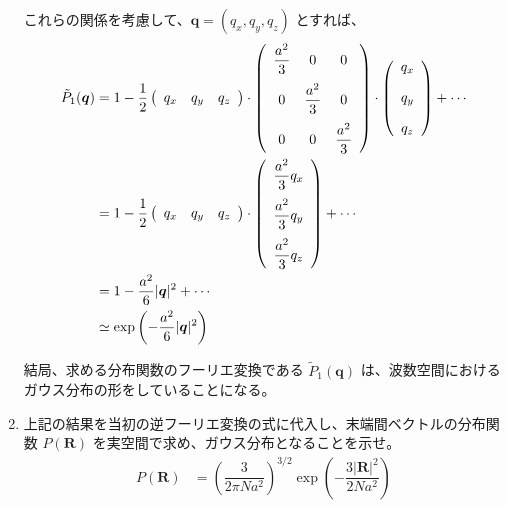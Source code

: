 \documentclass[uplatex,dvipdfmx,a4paper,11pt]{jsarticle}
\begin{document}
\begin{enumerate}
これらの関係を考慮して、$\bm{q} = (q_x, q_y, q_z)$ とすれば、
\begin{align*}
\tilde{P}_1 (\bm{q}) 
	&= 1 - \dfrac{1}{2}
	\left( 
	\begin{array}{c c c}
	q_x 	& q_y	& q_z
	\end{array}
	\right)
	\cdot 
	\left (
	\begin{array}{c c c}
	\dfrac{a^2}{3}	&	0				&	0 \\[10pt]
	0				&	\dfrac{a^2}{3}	&	0 \\[10pt]
	0				&	0				&	\dfrac{a^2}{3}
	\end{array}
	\right)
	\cdot
	\left( 
	\begin{array}{c}
	q_x \\[10pt]
	q_y \\[10pt]
	q_z
	\end{array}
	\right)
	+ \cdots \\
%
	&= 1 - \dfrac{1}{2}
	\left( 
	\begin{array}{c c c}
	q_x 	& q_y	& q_z
	\end{array}
	\right)
	\cdot
	\left( 
	\begin{array}{c}
	\dfrac{a^2}{3}q_x \\[10pt]
	\dfrac{a^2}{3}q_y \\[10pt]
	\dfrac{a^2}{3}q_z
	\end{array}
	\right)
	+ \cdots \\
%
%
	&= 1 - \dfrac{a^2}{6} |\bm{q}|^2 + \cdots \\
	&\simeq \exp \left( - \dfrac{a^2}{6} |\bm{q}|^2 \right)
\end{align*}


結局、求める分布関数のフーリエ変換である $\tilde{P}_1 (\bm{q}) $ は、波数空間におけるガウス分布の形をしていることになる。

\newpage

\color{black}

\item
上記の結果を当初の逆フーリエ変換の式に代入し、末端間ベクトルの分布関数 $P(\bm{R})$ を実空間で求め、ガウス分布となることを示せ。
\begin{align*}
P(\bm{R}) 
	&= \left( \dfrac{3}{2 \pi N a^2} \right)^{3/2} \exp \left( -\dfrac{3|\bm{R}|^2}{2Na^2} \right)
\end{align*}


\end{enumerate}
\end{document}
